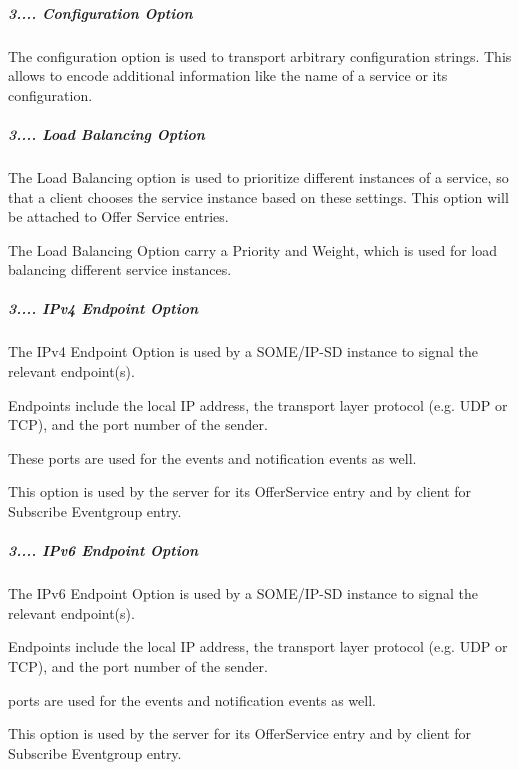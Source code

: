 \subparagraph*{3.... Configuration Option}


\begin{DoxyItemize}
\item The configuration option is used to transport arbitrary configuration strings. This allows to encode additional information like the name of a service or its configuration. 
\end{DoxyItemize}

\subparagraph*{3.... Load Balancing Option}


\begin{DoxyItemize}
\item The Load Balancing option is used to prioritize different instances of a service, so that a client chooses the service instance based on these settings. This option will be attached to Offer Service entries.
\item The Load Balancing Option carry a Priority and Weight, which is used for load balancing different service instances. 
\end{DoxyItemize}

\subparagraph*{3.... I\+Pv4 Endpoint Option}


\begin{DoxyItemize}
\item The I\+Pv4 Endpoint Option is used by a S\+O\+M\+E/\+I\+P-\/\+SD instance to signal the relevant endpoint(s).
\item Endpoints include the local IP address, the transport layer protocol (e.\+g. U\+DP or T\+CP), and the port number of the sender.
\item These ports are used for the events and notification events as well. 
\item This option is used by the server for its Offer\+Service entry and by client for Subscribe Eventgroup entry.
\end{DoxyItemize}

\subparagraph*{3.... I\+Pv6 Endpoint Option}


\begin{DoxyItemize}
\item The I\+Pv6 Endpoint Option is used by a S\+O\+M\+E/\+I\+P-\/\+SD instance to signal the relevant endpoint(s).
\item Endpoints include the local IP address, the transport layer protocol (e.\+g. U\+DP or T\+CP), and the port number of the sender.
\item ports are used for the events and notification events as well.
\item This option is used by the server for its Offer\+Service entry and by client for Subscribe Eventgroup entry. 
\end{DoxyItemize}

